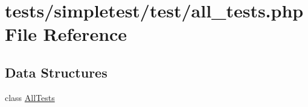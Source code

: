 \hypertarget{all__tests_8php}{\section{tests/simpletest/test/all\-\_\-tests.php File Reference}
\label{all__tests_8php}
}
\subsection*{Data Structures}
\begin{DoxyCompactItemize}
\item 
class \hyperlink{class_all_tests}{All\-Tests}
\end{DoxyCompactItemize}
